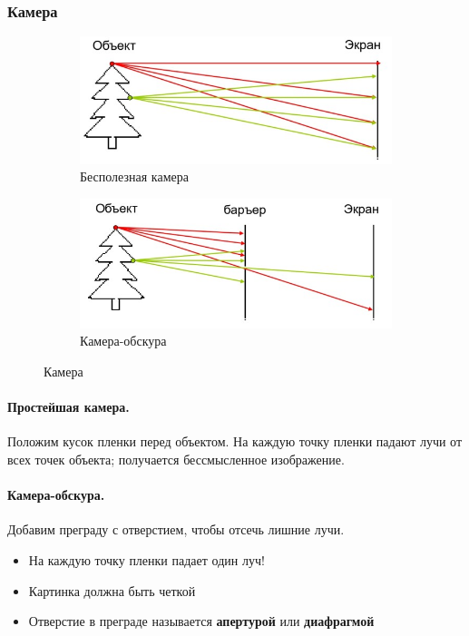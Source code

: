 \documentclass[a4paper, 14pt]{extarticle}
\begin{document}
\subsubsection{Камера}
\begin{figure}[h]
	\centering
	\begin{subfigure}[b]{0.45\textwidth}
		\centering
		\includegraphics[width=\textwidth]{l5/S019.jpg}
		\caption{Бесполезная камера}
	\end{subfigure}
	\begin{subfigure}[b]{0.45\textwidth}
		\centering
		\includegraphics[width=\textwidth]{l5/S020.jpg}
		\caption{Камера-обскура}
	\end{subfigure}
	\caption{Камера}
\end{figure}
\paragraph{Простейшая камера.} Положим кусок пленки перед объектом. На каждую точку пленки падают лучи от всех точек объекта; получается бессмысленное изображение.
\paragraph{Камера-обскура.} Добавим преграду с отверстием, чтобы отсечь лишние лучи.
\begin{itemize}
	\item На каждую точку пленки падает один луч!
	\item Картинка должна быть четкой
	\item Отверстие в преграде называется \textbf{апертурой} или \textbf{диафрагмой}
\end{itemize}
\end{document}
